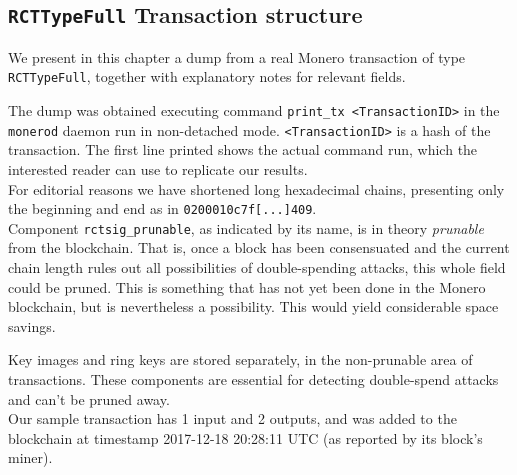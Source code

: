\begin{appendices}

\renewcommand{\theFancyVerbLine}{%
	\textcolor{red}{\small
		\arabic{FancyVerbLine}}}
	
	
\chapter{{\tt RCTTypeFull} Transaction structure}
\label{appendix:RCTTypeFull}

We present in this chapter a dump from a real Monero transaction of type {\tt RCTTypeFull}, 
together with explanatory notes for relevant fields.

The dump was obtained executing command {\tt print\_tx <TransactionID>} in the {\tt monerod} daemon run in non-detached mode. {\tt <TransactionID>} is a hash of the transaction. The first line printed shows the actual command run, which the interested reader can use to replicate our results.%
\\

For editorial reasons we have shortened long hexadecimal chains, presenting only the beginning and end as in {\tt 0200010c7f[...]409}.
\\

Component {\tt rctsig\_prunable}, as indicated by its name, is in theory {\sl prunable} from the blockchain. That is, once a block has been consensuated and the current chain length rules out all possibilities of double-spending attacks, this whole field could be pruned. This is something that has not yet been done in the Monero blockchain, but is nevertheless a possibility. This would yield considerable space savings. 

Key images and ring keys are stored separately, in the non-prunable area of transactions. These components are essential for detecting double-spend attacks and can’t be pruned away.
\\

Our sample transaction has 1 input and 2 outputs, and was added to the blockchain at timestamp 2017-12-18 20:28:11 UTC (as reported by its block's miner).



\end{appendices}
